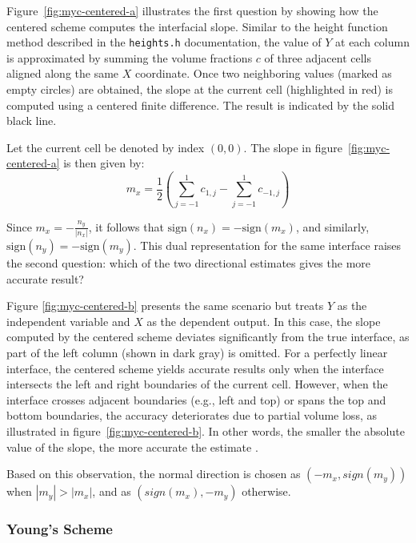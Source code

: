 Figure~\ref{fig:myc-centered-a} illustrates the first question by showing how the centered scheme computes the interfacial slope. Similar to the height function method described in the \texttt{heights.h} documentation, the value of $Y$ at each column is approximated by summing the volume fractions $c$ of three adjacent cells aligned along the same $X$ coordinate. Once two neighboring values (marked as empty circles) are obtained, the slope at the current cell (highlighted in red) is computed using a centered finite difference. The result is indicated by the solid black line.

Let the current cell be denoted by index $(0, 0)$. The slope in figure~\ref{fig:myc-centered-a} is then given by:
\begin{equation}
m_x = \frac{1}{2} \left(\sum_{j=-1}^{1} c_{1,j} - \sum_{j=-1}^{1} c_{-1,j} \right)
\end{equation}

Since $m_x = -\frac{n_y}{|n_x|}$, it follows that $\text{sign}(n_x) = -\text{sign}(m_x)$, and similarly, $\text{sign}(n_y) = -\text{sign}(m_y)$. This dual representation for the same interface raises the second question: which of the two directional estimates gives the more accurate result?

Figure \ref{fig:myc-centered-b} presents the same scenario but treats $Y$ as the independent variable and $X$ as the dependent output. In this case, the slope computed by the centered scheme deviates significantly from the true interface, as part of the left column (shown in dark gray) is omitted. For a perfectly linear interface, the centered scheme yields accurate results only when the interface intersects the left and right boundaries of the current cell. However, when the interface crosses adjacent boundaries (e.g., left and top) or spans the top and bottom boundaries, the accuracy deteriorates due to partial volume loss, as illustrated in figure~\ref{fig:myc-centered-b}. In other words, the smaller the absolute value of the slope, the more accurate the estimate \cite{2007_Aulisa}.

Based on this observation, the normal direction is chosen as $(-m_x, sign(m_y))$ when $|m_y| > |m_x|$, and as $(sign(m_x), -m_y)$ otherwise.

\subsubsection{Young's Scheme}

